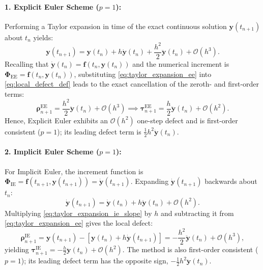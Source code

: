 \documentclass[11pt,a4paper]{article}
\theoremstyle{definition}
\theoremstyle{remark}
\begin{document}
\paragraph{1. Explicit Euler Scheme ($p=1$):}
Performing a Taylor expansion in time of the exact continuous solution $\mathbf{y}(t_{n+1})$ about $t_n$ yields:
\begin{equation}
\label{eq:taylor_expansion_ee}
\mathbf{y}(t_{n+1}) = \mathbf{y}(t_n) + h \dot{\mathbf{y}}(t_n) + \frac{h^2}{2} \ddot{\mathbf{y}}(t_n) + \mathcal{O}(h^3).
\end{equation}
Recalling that $\dot{\mathbf{y}}(t_n) = \mathbf{f}(t_n, \mathbf{y}(t_n))$ and the numerical increment is $\mathbf{\Phi}_{\text{EE}} = \mathbf{f}(t_n, \mathbf{y}(t_n))$, substituting \eqref{eq:taylor_expansion_ee} into \eqref{eq:local_defect_def} leads to the exact cancellation of the zeroth- and first-order terms:
\begin{equation}
\label{eq:euler_defect_expansion}
\boldsymbol{\rho}_{n+1}^{\text{EE}} = \frac{h^2}{2} \ddot{\mathbf{y}}(t_n) + \mathcal{O}(h^3) \implies \boldsymbol{\tau}_{n+1}^{\text{EE}} = \frac{h}{2} \ddot{\mathbf{y}}(t_n) + \mathcal{O}(h^2).
\end{equation}
Hence, Explicit Euler exhibits an $\mathcal{O}(h^2)$ one-step defect and is first-order consistent ($p=1$); its leading defect term is $\tfrac12 h^2\ddot{\mathbf{y}}(t_n)$.

\paragraph{2. Implicit Euler Scheme ($p=1$):}
For Implicit Euler, the increment function is $\mathbf{\Phi}_{\text{IE}} = \mathbf{f}(t_{n+1}, \mathbf{y}(t_{n+1})) = \dot{\mathbf{y}}(t_{n+1})$. Expanding $\dot{\mathbf{y}}(t_{n+1})$ backwards about $t_n$:
\begin{equation}
\label{eq:taylor_expansion_ie_slope}
\dot{\mathbf{y}}(t_{n+1}) = \dot{\mathbf{y}}(t_n) + h \ddot{\mathbf{y}}(t_n) + \mathcal{O}(h^2).
\end{equation}
Multiplying \eqref{eq:taylor_expansion_ie_slope} by $h$ and subtracting it from \eqref{eq:taylor_expansion_ee} gives the local defect:
\begin{equation}
\label{eq:ie_defect_expansion}
\boldsymbol{\rho}_{n+1}^{\text{IE}} = \mathbf{y}(t_{n+1}) - \left[ \mathbf{y}(t_n) + h \dot{\mathbf{y}}(t_{n+1}) \right] = -\frac{h^2}{2} \ddot{\mathbf{y}}(t_n) + \mathcal{O}(h^3),
\end{equation}
yielding $\boldsymbol{\tau}_{n+1}^{\text{IE}} = -\frac{h}{2} \ddot{\mathbf{y}}(t_n) + \mathcal{O}(h^2)$. The method is also first-order consistent ($p=1$); its leading defect term has the opposite sign, $-\tfrac12 h^2\ddot{\mathbf{y}}(t_n)$.
\end{document}

